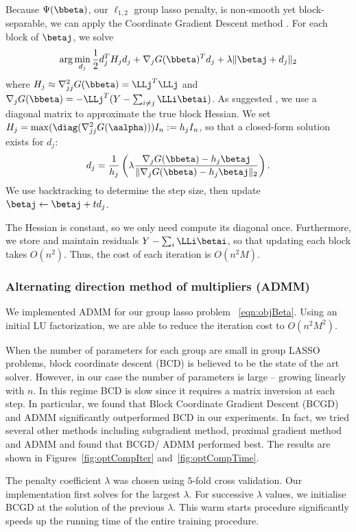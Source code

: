 Because $\Psi(\bbeta)$, our $\ell_{1,2}$ group lasso penalty, is non-smooth yet block-separable,
we can apply the Coordinate Gradient Descent method \citep{cgd:2009}.
For each block of $\betaj$, we solve
\[
\arg\min_{d_j} \frac{1}{2}d_j^T H_j d_j + \nabla_{j}G(\bbeta)^T d_j 
+ \lambda \|\betaj+d_j\|_2
\]
where $H_j \approx \nabla^2_{jj}G(\bbeta) = \LLj^T \LLj$ 
and $\nabla_j G(\bbeta) = -\LLj^T (Y-\sum_{i\ne j}{\LLi \betai})$.
As suggested \citet{cgd:2009}, we use a diagonal matrix to approximate the true block Hessian.
We set $H_j = \max(\diag(\nabla^2_{jj}G(\aalpha))) I_n := h_j I_n$, so that a closed-form solution exists
for $d_j$:
\[
d_j = \frac{1}{h_j}\left(\lambda \frac{\nabla_j G(\bbeta) - h_j \betaj}
{\|\nabla_j G(\bbeta) - h_j \betaj\|_2}\right).
\]
We use backtracking to determine the step size, then update $\betaj \leftarrow \betaj + t d_j$.

The Hessian is constant, so we only need compute its diagonal once. Furthermore, we store and maintain residuals $Y - \sum_{i}{\LLi \betai}$, so that updating each block takes $O(n^2)$. Thus, the cost of each iteration is $O(n^2M)$.

\subsubsection*{Alternating direction method of multipliers (ADMM)}

We implemented ADMM for our group lasso problem ~\eqref{eqn:objBeta}. Using an initial LU factorization, we are able to reduce the iteration cost to $O(n^2M^2)$. 

When the number of parameters for each group are small in group LASSO problems, 
block coordinate descent (BCD) is believed
to be the state of the art solver. However, in our case the number of parameters
is large -- growing linearly with $n$. In this regime BCD is slow since it
requires a matrix inversion at each step. In particular, we found that Block
Coordinate Gradient Descent (BCGD) and ADMM significantly outperformed BCD in our
experiments. 
In fact, we tried several other methods including subgradient method, proximal
gradient method and ADMM and found that BCGD/ ADMM performed best.
The results are shown in Figures~\ref{fig:optCompIter} and~\ref{fig:optCompTime}.

\insertFigOpt

The penalty coefficient $\lambda$ was chosen using $5$-fold cross validation. 
Our implementation
first solves for the largest $\lambda$. For successive $\lambda$
values, we initialise BCGD at the solution of the previous $\lambda$. This
warm starts procedure significantly speeds up the running time of the entire
training procedure.

